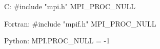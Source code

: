 C:
#include "mpi.h"
MPI_PROC_NULL

Fortran:
#include "mpif.h"
MPI_PROC_NULL

Python:
MPI.PROC_NULL = -1
